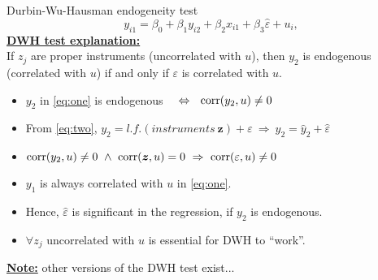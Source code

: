 \documentclass[usenames,dvipsnames]{beamer}
\begin{document}
\begin{frame}{Durbin-Wu-Hausman endogeneity test}
$$y_{i1}=\beta_0+\beta_1 y_{i2} + \beta_2 x_{i1} + \beta_3 \hat{\varepsilon} + u_i,$$
\medskip
\textbf{\underline{DWH test explanation:}} \\If $z_j$ are proper instruments (uncorrelated with $u$), then $y_2$ is endogenous (correlated with $u$) if and only if $\varepsilon$ is correlated with $u$. \\
\medskip
\begin{itemize}
\item $y_2$ in \eqref{eq:one} is endogenous ~~$\Leftrightarrow ~~\textnormal{corr}(y_2,u)\neq0$
\item From \eqref{eq:two}, $y_2 = \textit{l.f.}(\textit{instruments} \bm{~z}) + \varepsilon ~\Rightarrow~ y_2 = \hat{y}_2 + \hat{\varepsilon}$
\item $\textnormal{corr}(y_2,u)\neq0 ~\wedge~\textnormal{corr}(\bm{z},u) = 0 ~\Rightarrow~ \textnormal{corr}(\varepsilon,u)\neq0 $
\item $y_1$ is always correlated with $u$ in \eqref{eq:one}. 
\item Hence, $\hat{\varepsilon}$ is significant in the regression, if $y_2$ is endogenous.
\item $\forall z_j$ uncorrelated with $u$ is essential for DWH to ``work''.
\end{itemize}


\bigskip
\textbf{\underline{Note:}} other versions of the DWH test exist...
\end{frame}
\end{document}

